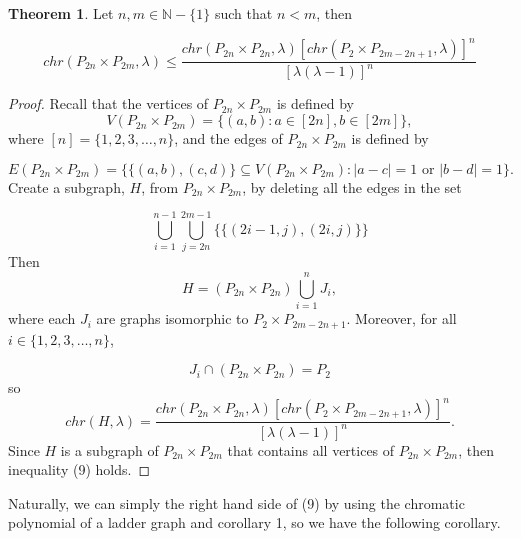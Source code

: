\documentclass[11pt]{article}
\theoremstyle{definition}
\newcommand{\N}{{\mathbb{N}}}
\newtheorem{thm}{Theorem}
\begin{document}
\begin{thm}
Let $n,m \in \N - \{1\}$ such that $n < m$, then

\begin{equation}
chr(P_{2n} \times P_{2m}, \lambda) \leq \frac{chr(P_{2n} \times P_{2n}, \lambda)[chr(P_{2} \times P_{2m - 2n + 1}, \lambda)]^n}{[\lambda(\lambda - 1)]^n}
\end{equation}
\end{thm}

\begin{proof}
Recall that the vertices of $P_{2n} \times P_{2m}$ is defined by 
\begin{equation}
V(P_{2n} \times P_{2m}) = \{(a,b): a\in [2n],b \in [2m]\}, \nonumber
\end{equation} where $[n] = \{1, 2, 3,\ldots, n\}$, and the edges of $P_{2n} \times P_{2m}$ is defined by

\begin{equation}
E(P_{2n} \times P_{2m}) =\{ \{(a, b),(c, d)\} \subseteq V(P_{2n} \times P_{2m}): |a - c| = 1 \text{ or } |b - d| = 1 \}. \nonumber
\end{equation} Create a subgraph, $H$, from $P_{2n} \times P_{2m}$, by deleting all the edges in the set

\begin{equation}
\bigcup_{i = 1}^{n - 1} \bigcup_{j = 2n}^{2m - 1} \{ \{(2i - 1, j),(2i, j)\} \} \nonumber
\end{equation} Then
\begin{equation}
H = (P_{2n} \times P_{2n}) \bigcup_{i = 1}^{n}J_{i}, \nonumber
\end{equation} where each $J_i$ are graphs isomorphic to $P_{2} \times P_{2m - 2n + 1}$. Moreover, for all $i \in \{1, 2, 3,\ldots, n \}$, 

\begin{equation}
J_i \cap (P_{2n} \times P_{2n}) = P_2 \nonumber
\end{equation} so 
\begin{equation}
chr(H,\lambda) = \frac{chr(P_{2n} \times P_{2n}, \lambda)[chr(P_{2} \times P_{2m - 2n + 1}, \lambda)]^n}{[\lambda(\lambda - 1)]^n}. \nonumber
\end{equation} Since $H$ is a subgraph of $P_{2n} \times P_{2m}$ that contains all vertices of $P_{2n} \times P_{2m}$, then inequality (9) holds.
\end{proof}
Naturally, we can simply the right hand side of (9) by using the chromatic polynomial of a ladder graph and corollary 1, so we have the following corollary.
\end{document}
